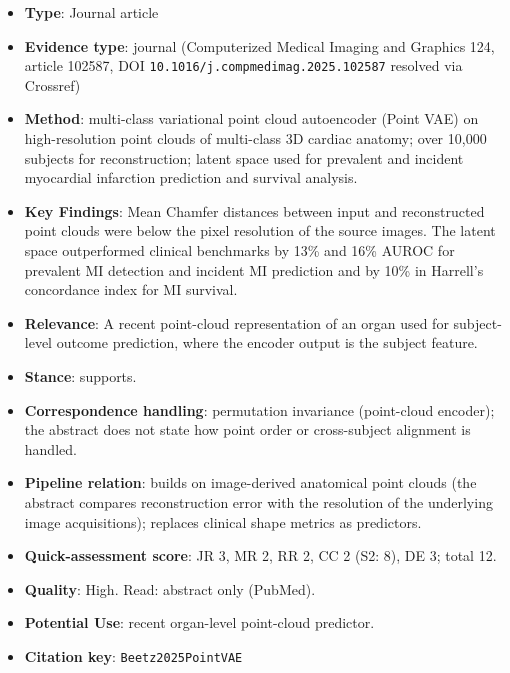 \documentclass[journal,onecolumn]{IEEEtran}
\begin{document}
\begin{itemize}

\item{} \textbf{Type}: Journal article

\item{} \textbf{Evidence type}: journal (Computerized Medical Imaging and Graphics 124, article 102587, DOI \nolinkurl{10.1016/j.compmedimag.2025.102587} resolved via Crossref)

\item{} \textbf{Method}: multi-class variational point cloud autoencoder (Point VAE) on high-resolution point clouds of multi-class 3D cardiac anatomy; over 10,000 subjects for reconstruction; latent space used for prevalent and incident myocardial infarction prediction and survival analysis.

\item{} \textbf{Key Findings}: Mean Chamfer distances between input and reconstructed point clouds were below the pixel resolution of the source images. The latent space outperformed clinical benchmarks by 13\% and 16\% AUROC for prevalent MI detection and incident MI prediction and by 10\% in Harrell's concordance index for MI survival.

\item{} \textbf{Relevance}: A recent point-cloud representation of an organ used for subject-level outcome prediction, where the encoder output is the subject feature.

\item{} \textbf{Stance}: supports.

\item{} \textbf{Correspondence handling}: permutation invariance (point-cloud encoder); the abstract does not state how point order or cross-subject alignment is handled.

\item{} \textbf{Pipeline relation}: builds on image-derived anatomical point clouds (the abstract compares reconstruction error with the resolution of the underlying image acquisitions); replaces clinical shape metrics as predictors.

\item{} \textbf{Quick-assessment score}: JR 3, MR 2, RR 2, CC 2 (S2: 8), DE 3; total 12.

\item{} \textbf{Quality}: High. Read: abstract only (PubMed).

\item{} \textbf{Potential Use}: recent organ-level point-cloud predictor.

\item{} \textbf{Citation key}: \texttt{Beetz2025PointVAE}

\end{itemize}
\end{document}
